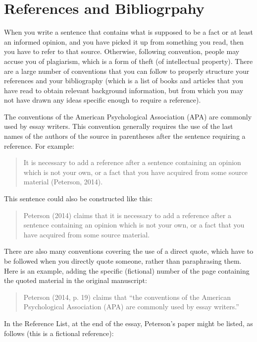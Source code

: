 \documentclass{article}
\begin{document}
\section{References and Bibliogrpahy}

When you write a sentence that contains what is supposed to be a fact or
at least an informed opinion, and you have picked it up from something
you read, then you have to refer to that source. Otherwise, following
convention, people may accuse you of plagiarism, which is a form of
theft (of intellectual property). There are a large number of
conventions that you can follow to properly structure your references
and your bibliography (which is a list of books and articles that you
have read to obtain relevant background information, but from which you
may not have drawn any ideas specific enough to require a reference).

The conventions of the American Psychological Association (APA) are
commonly used by essay writers. This convention generally requires the
use of the last names of the authors of the source in parentheses after
the sentence requiring a reference. For example:

\begin{quote}
It is necessary to add a reference after a sentence containing an
opinion which is not your own, or a fact that you have acquired from
some source material (Peterson, 2014).
\end{quote}

This sentence could also be constructed like this:

\begin{quote}
Peterson (2014) claims that it is necessary to add a reference
after a sentence containing an opinion which is not your own, or a fact
that you have acquired from some source material.
\end{quote}

There are also many conventions covering the use of a direct quote,
which have to be followed when you directly quote someone, rather than
paraphrasing them. Here is an example, adding the specific (fictional)
number of the page containing the quoted material in the original
manuscript:

\begin{quote}
Peterson (2014, p. 19) claims that ``the conventions of the
American Psychological Association (APA) are commonly used by essay
writers.''
\end{quote}

In the Reference List, at the end of the essay, Peterson's paper might
be listed, as follows (this is a fictional reference):
\end{document}
